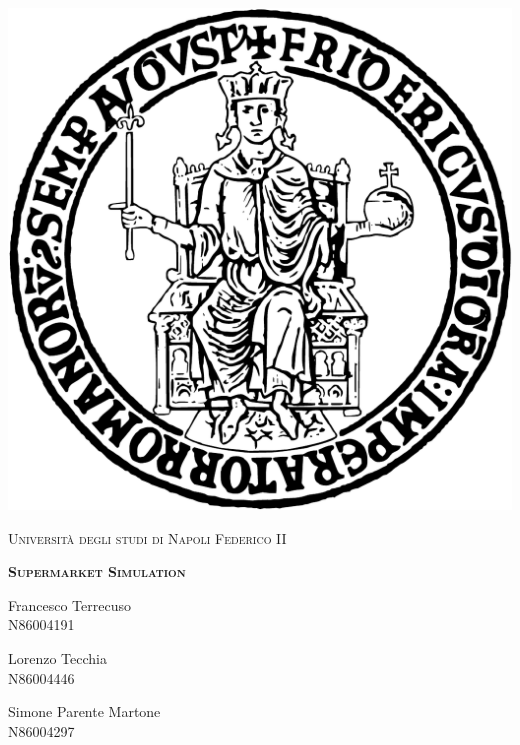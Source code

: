 \documentclass[a4paper, 12pt]{article}
\begin{document}
\begin{titlepage}

    \begin{center}
        \includegraphics[scale=0.4]{Images/logo-federico-II.pdf} 
    \end{center}

    \thispagestyle{empty}

    \center

    \textsc{\large Università degli studi di Napoli Federico II}

    \vspace{0.5in}

    \noindent\makebox[\linewidth]{\rule{\linewidth}{1.2pt}}
    \textsc{ \textbf{\large Supermarket Simulation }}
    \noindent\makebox[\linewidth]{\rule{\linewidth}{1.2pt}}

    \vspace{0.5in}

    \begin{minipage}{0.30\textwidth}
        \begin{flushleft}
            Francesco Terrecuso \\
            N86004191
        \end{flushleft}
    \end{minipage}
    \begin{minipage}{0.30\textwidth}
        \begin{center}
            Lorenzo Tecchia \\
            N86004446
        \end{center}
    \end{minipage}
    \begin{minipage}{0.35\textwidth}
        \begin{flushright}
            Simone Parente Martone \\
            N86004297
        \end{flushright}
    \end{minipage}


\end{titlepage}
\end{document}
